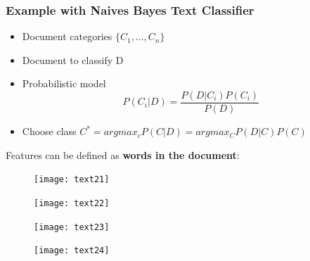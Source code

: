 \subsubsection{Example with Naives Bayes Text Classifier}
\begin{itemize}
\item Document categories $\{  C_1, ... ,C_n \}$
\item Document to classify D
\item Probabilistic model $$ P(C_i|D) = \frac{P(D|C_i)P(C_i)}{P(D)}$$
\item Choose class $C^{*}=argmax_c P(C|D) = argmax_C P(D|C)P(C)$
\end{itemize}
Features can be defined as \textbf{words in the document}:
 \begin{figure}[H]
  \centering
  \texttt{[image: text21]}
\end{figure}
 \begin{figure}[H]
  \centering
  \texttt{[image: text22]}
\end{figure}
 \begin{figure}[H]
  \centering
  \texttt{[image: text23]}
\end{figure}
 \begin{figure}[H]
  \centering
  \texttt{[image: text24]}
\end{figure}

